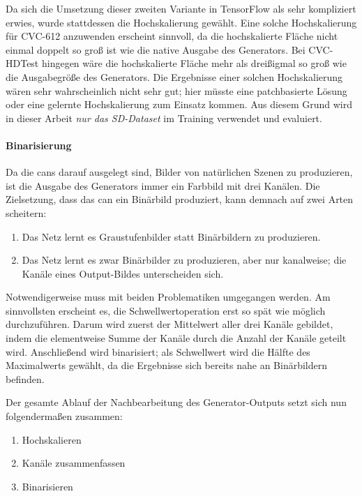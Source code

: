 Da sich die Umsetzung dieser zweiten Variante in TensorFlow als sehr kompliziert erwies, wurde stattdessen die Hochskalierung gewählt.
Eine solche Hochskalierung für CVC-612 anzuwenden erscheint sinnvoll, da die hochskalierte Fläche nicht einmal doppelt so groß ist wie die native Ausgabe des Generators.
Bei CVC-HDTest hingegen wäre die hochskalierte Fläche mehr als dreißigmal so groß wie die Ausgabegröße des Generators.
Die Ergebnisse einer solchen Hochskalierung wären sehr wahrscheinlich nicht sehr gut; hier müsste eine patchbasierte Lösung oder eine gelernte Hochskalierung zum Einsatz kommen.
Aus diesem Grund wird in dieser Arbeit \emph{nur das SD-Dataset} im Training verwendet und evaluiert.



\paragraph{Binarisierung}

Da die \glspl{can} darauf ausgelegt sind, Bilder von natürlichen Szenen zu produzieren, ist die Ausgabe des Generators immer ein Farbbild mit drei Kanälen.
Die Zielsetzung, dass das \gls{can} ein Binärbild produziert, kann demnach auf zwei Arten scheitern:

\begin{enumerate}
	\item Das Netz lernt es Graustufenbilder statt Binärbildern zu produzieren.
	\item Das Netz lernt es zwar Binärbilder zu produzieren, aber nur kanalweise; die Kanäle eines Output-Bildes unterscheiden sich.
\end{enumerate}

Notwendigerweise muss mit beiden Problematiken umgegangen werden.
Am sinnvollsten erscheint es, die Schwellwertoperation erst so spät wie möglich durchzuführen.
Darum wird zuerst der Mittelwert aller drei Kanäle gebildet, indem die elementweise Summe der Kanäle durch die Anzahl der Kanäle geteilt wird.
Anschließend wird binarisiert; als Schwellwert wird die Hälfte des Maximalwerts gewählt, da die Ergebnisse sich bereits nahe an Binärbildern befinden.

Der gesamte Ablauf der Nachbearbeitung des Generator-Outputs setzt sich nun folgendermaßen zusammen:

\begin{enumerate}
	\item Hochskalieren
	\item Kanäle zusammenfassen
	\item Binarisieren
\end{enumerate}

